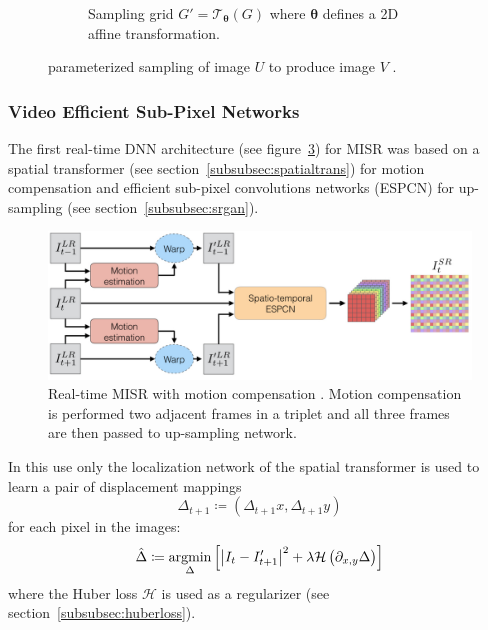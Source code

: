 \begin{figure}[!htbp]
\begin{subfigure}[b]{.39\textwidth}
        \caption{Sampling grid \(G' = \mathcal{T}_{\bm{\theta}}(G)\) where \(\bm{\theta}\) defines a 2D affine transformation.}\label{subfig:spacetransformer_ttheta}
    \end{subfigure}
    \caption{parameterized sampling of image \(U\) to produce image \(V\) \cite{jaderberg2015spatial}.}\label{fig:paramsampling}
\end{figure}


\subsubsection{Video Efficient Sub-Pixel Networks}



The first real-time DNN architecture (see figure~\ref{fig:realtimeepscn}) for MISR was based on a spatial transformer (see section~\ref{subsubsec:spatialtrans}) for motion compensation and efficient sub-pixel convolutions networks (ESPCN) for up-sampling (see section~\ref{subsubsec:srgan}).
\begin{figure}[!htbp]
    \includegraphics[width=\textwidth]{figures/neural_networks/realtime_epscn.png}
    \caption{Real-time MISR with motion compensation \cite{caballero2017real}. Motion compensation is performed two adjacent frames in a triplet and all three frames are then passed to up-sampling network.}\label{fig:realtimeepscn}
\end{figure}
%
In this use only the localization network of the spatial transformer is used to learn a pair of displacement mappings 
\begin{equation}
    \Delta_{t+1} \coloneqq (\Delta_{t+1}x, \Delta_{t+1} y)
\end{equation}
for each pixel in the images:
\begin{equation}
    \hat{\Delta} \coloneqq \underset{\Delta}{\text{argmin}}\left[\abs{I_t - I'_{t+1}}^2 + \lambda \mathcal{H}\left( \partial_{x,y} \Delta\right)\right]
\end{equation}
where the Huber loss \(\mathcal{H}\) is used as a regularizer (see section~\ref{subsubsec:huberloss}).
